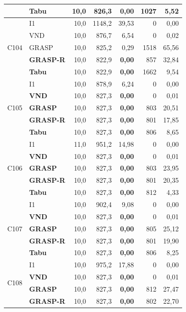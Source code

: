 {\begin{longtable}{llrrrrr}
  & \textbf{Tabu} & 10,0 & 826,3 & \textbf{0,00} & 1027 & 5,52 \\
\midrule
\multirow{5}{*}{C104}
  & I1 & 10,0 & 1148,2 & 39,53 & 0 & 0,00 \\
  & VND & 10,0 & 876,7 & 6,54 & 0 & 0,02 \\
  & GRASP & 10,0 & 825,2 & 0,29 & 1518 & 65,56 \\
  & \textbf{GRASP-R} & 10,0 & 822,9 & \textbf{0,00} & 857 & 32,84 \\
  & \textbf{Tabu} & 10,0 & 822,9 & \textbf{0,00} & 1662 & 9,54 \\
\midrule
\multirow{5}{*}{C105}
  & I1 & 10,0 & 878,9 & 6,24 & 0 & 0,00 \\
  & \textbf{VND} & 10,0 & 827,3 & \textbf{0,00} & 0 & 0,01 \\
  & \textbf{GRASP} & 10,0 & 827,3 & \textbf{0,00} & 803 & 20,51 \\
  & \textbf{GRASP-R} & 10,0 & 827,3 & \textbf{0,00} & 801 & 17,85 \\
  & \textbf{Tabu} & 10,0 & 827,3 & \textbf{0,00} & 806 & 8,65 \\
\midrule
\multirow{5}{*}{C106}
  & I1 & 11,0 & 951,2 & 14,98 & 0 & 0,00 \\
  & \textbf{VND} & 10,0 & 827,3 & \textbf{0,00} & 0 & 0,01 \\
  & \textbf{GRASP} & 10,0 & 827,3 & \textbf{0,00} & 803 & 23,95 \\
  & \textbf{GRASP-R} & 10,0 & 827,3 & \textbf{0,00} & 801 & 20,35 \\
  & \textbf{Tabu} & 10,0 & 827,3 & \textbf{0,00} & 812 & 4,33 \\
\midrule
\multirow{5}{*}{C107}
  & I1 & 10,0 & 902,4 & 9,08 & 0 & 0,00 \\
  & \textbf{VND} & 10,0 & 827,3 & \textbf{0,00} & 0 & 0,01 \\
  & \textbf{GRASP} & 10,0 & 827,3 & \textbf{0,00} & 805 & 25,12 \\
  & \textbf{GRASP-R} & 10,0 & 827,3 & \textbf{0,00} & 801 & 19,90 \\
  & \textbf{Tabu} & 10,0 & 827,3 & \textbf{0,00} & 806 & 8,25 \\
\midrule
\multirow{5}{*}{C108}
  & I1 & 10,0 & 975,2 & 17,88 & 0 & 0,00 \\
  & \textbf{VND} & 10,0 & 827,3 & \textbf{0,00} & 0 & 0,01 \\
  & \textbf{GRASP} & 10,0 & 827,3 & \textbf{0,00} & 812 & 27,47 \\
  & \textbf{GRASP-R} & 10,0 & 827,3 & \textbf{0,00} & 802 & 22,70 \\

\end{longtable}}
